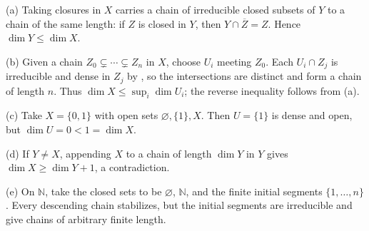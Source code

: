 (a) Taking closures in $X$ carries a chain of irreducible closed subsets of $Y$ to a chain of the same length: if $Z$ is closed in $Y$, then $Y\cap\overline Z=Z$. Hence $\dim Y\le\dim X$.

(b) Given a chain $Z_0\subsetneq\cdots\subsetneq Z_n$ in $X$, choose $U_i$ meeting $Z_0$. Each $U_i\cap Z_j$ is irreducible and dense in $Z_j$ by , so the intersections are distinct and form a chain of length $n$. Thus $\dim X\le\sup_i\dim U_i$; the reverse inequality follows from (a).

(c) Take $X=\{0,1\}$ with open sets $\varnothing,\{1\},X$. Then $U=\{1\}$ is dense and open, but $\dim U=0<1=\dim X$.

(d) If $Y\ne X$, appending $X$ to a chain of length $\dim Y$ in $Y$ gives $\dim X\ge\dim Y+1$, a contradiction.

(e) On $\mathbb N$, take the closed sets to be $\varnothing$, $\mathbb N$, and the finite initial segments $\{1,\ldots,n\}$. Every descending chain stabilizes, but the initial segments are irreducible and give chains of arbitrary finite length.
